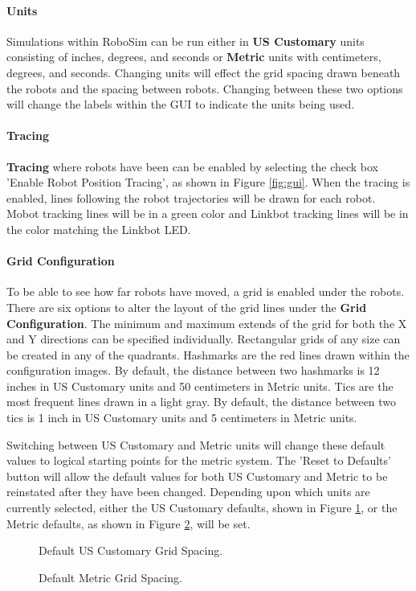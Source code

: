 \documentclass{article}
\begin{document}
\paragraph{Units}
Simulations within RoboSim can be run either in {\bf US Customary} units
consisting of inches, degrees, and seconds or {\bf Metric} units with
centimeters, degrees, and seconds.  Changing units will effect the grid spacing
drawn beneath the robots and the spacing between robots.  Changing between these
two options will change the labels within the GUI to indicate the units being
used.

\paragraph{Tracing}
{\bf Tracing} where robots have been can be enabled by selecting the check box
'Enable Robot Position Tracing', as shown in Figure \ref{fig:gui}.  When the
tracing is enabled, lines following the robot trajectories will be drawn for
each robot.  Mobot tracking lines will be in a green color and Linkbot tracking
lines will be in the color matching the Linkbot LED.

\paragraph{Grid Configuration}
To be able to see how far robots have moved, a grid is enabled under the robots.
There are six options to alter the layout of the grid lines under the {\bf Grid
Configuration}.  The minimum and maximum extends of the grid for both the X and
Y directions can be specified individually.  Rectangular grids of any size can
be created in any of the quadrants.  Hashmarks are the red lines drawn within
the configuration images.  By default, the distance between two hashmarks is 12
inches in US Customary units and 50 centimeters in Metric units.  Tics are the
most frequent lines drawn in a light gray.  By default, the distance between two
tics is 1 inch in US Customary units and 5 centimeters in Metric units.

Switching between US Customary and Metric units will change these default values
to logical starting points for the metric system.  The 'Reset to Defaults'
button will allow the default values for both US Customary and Metric to be
reinstated after they have been changed.  Depending upon which units are
currently selected, either the US Customary defaults, shown in Figure
\ref{fig:grid_us}, or the Metric defaults, as shown in Figure
\ref{fig:grid_metric}, will be set.
\begin{figure}[H]
	\begin{center}
	\end{center}
	\caption{Default US Customary Grid Spacing.}
	\label{fig:grid_us}
\end{figure}
\begin{figure}[H]
	\begin{center}
	\end{center}
	\caption{Default Metric Grid Spacing.}
	\label{fig:grid_metric}
\end{figure}
\end{document}
